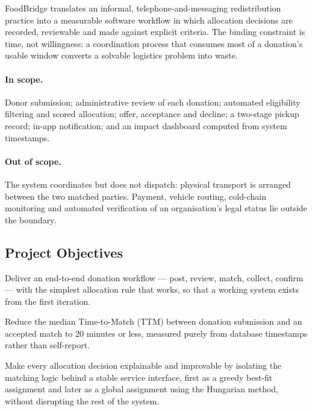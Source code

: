 \documentclass[11pt,a4paper]{article}
\begin{document}
FoodBridge translates an informal, telephone-and-messaging redistribution
practice into a measurable software workflow in which allocation decisions are
recorded, reviewable and made against explicit criteria. The binding constraint
is time, not willingness: a coordination process that consumes most of a
donation's usable window converts a solvable logistics problem into waste.

\paragraph{In scope.} Donor submission; administrative review of each donation;
automated eligibility filtering and scored allocation; offer, acceptance and
decline; a two-stage pickup record; in-app notification; and an impact dashboard
computed from system timestamps.

\paragraph{Out of scope.} The system coordinates but does not dispatch: physical
transport is arranged between the two matched parties. Payment, vehicle routing,
cold-chain monitoring and automated verification of an organisation's legal
status lie outside the boundary.

\subsection{Project Objectives}
\begin{description}[leftmargin=1.9cm,style=nextline,font=\normalfont\bfseries]
  \item[OBJ-1] Deliver an end-to-end donation workflow --- post, review, match,
    collect, confirm --- with the simplest allocation rule that works, so that a
    working system exists from the first iteration.
  \item[OBJ-2] Reduce the median Time-to-Match (TTM) between donation submission
    and an accepted match to 20 minutes or less, measured purely from database
    timestamps rather than self-report.
  \item[OBJ-3] Make every allocation decision explainable and improvable by
    isolating the matching logic behind a stable service interface, first as a
    greedy best-fit assignment and later as a global assignment using the
    Hungarian method, without disrupting the rest of the system.
\end{description}
\end{document}
